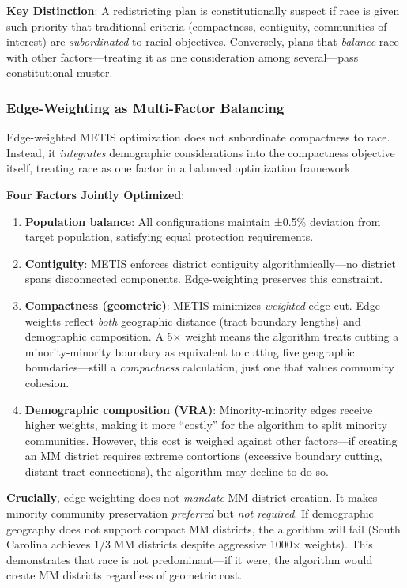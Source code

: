 \textbf{Key Distinction}: A redistricting plan is constitutionally suspect if race is given such priority that traditional criteria (compactness, contiguity, communities of interest) are \emph{subordinated} to racial objectives. Conversely, plans that \emph{balance} race with other factors---treating it as one consideration among several---pass constitutional muster.

\subsubsection{Edge-Weighting as Multi-Factor Balancing}

Edge-weighted METIS optimization does not subordinate compactness to race. Instead, it \emph{integrates} demographic considerations into the compactness objective itself, treating race as one factor in a balanced optimization framework.

\textbf{Four Factors Jointly Optimized}:

\begin{enumerate}
    \item \textbf{Population balance}: All configurations maintain ±0.5\% deviation from target population, satisfying equal protection requirements.
    \item \textbf{Contiguity}: METIS enforces district contiguity algorithmically---no district spans disconnected components. Edge-weighting preserves this constraint.
    \item \textbf{Compactness (geometric)}: METIS minimizes \emph{weighted} edge cut. Edge weights reflect \emph{both} geographic distance (tract boundary lengths) and demographic composition. A 5× weight means the algorithm treats cutting a minority-minority boundary as equivalent to cutting five geographic boundaries---still a \emph{compactness} calculation, just one that values community cohesion.
    \item \textbf{Demographic composition (VRA)}: Minority-minority edges receive higher weights, making it more ``costly'' for the algorithm to split minority communities. However, this cost is weighed against other factors---if creating an MM district requires extreme contortions (excessive boundary cutting, distant tract connections), the algorithm may decline to do so.
\end{enumerate}

\textbf{Crucially}, edge-weighting does not \emph{mandate} MM district creation. It makes minority community preservation \emph{preferred} but \emph{not required}. If demographic geography does not support compact MM districts, the algorithm will fail (South Carolina achieves 1/3 MM districts despite aggressive 1000× weights). This demonstrates that race is not predominant---if it were, the algorithm would create MM districts regardless of geometric cost.

